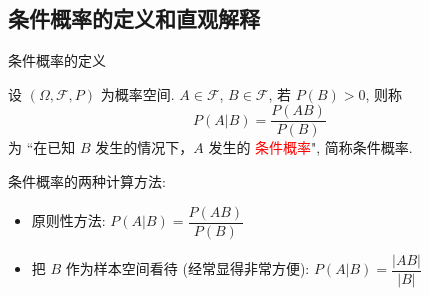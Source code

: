 \subsection{条件概率的定义和直观解释}%

\begin{frame}{条件概率的定义}
	\begin{defi}
		设 $(\Omega,\mathcal{F},P)$ 为概率空间. $A\in\mathcal{F}$, $B\in\mathcal{F}$, 若 $P (B)>0$, 则称 $$P (A|B)=\frac{P (AB)}{P (B)}$$ 为 ``在已知 $B$ 发生的情况下，$A$ 发生的 \textcolor{red}{条件概率}", 简称条件概率.
	\end{defi}
	\pause
	\vspace{0.4cm}
	\begin{rmk} 条件概率的两种计算方法:
		\begin{itemize}[<+-|alert@+>]
			\item 原则性方法: $P (A|B)=\dfrac{P (AB)}{P (B)}$
			\item 把 $B$ 作为样本空间看待 (经常显得非常方便): $P (A|B)=\dfrac{|AB|}{|B|}$
		\end{itemize}
	\end{rmk}
\end{frame}


